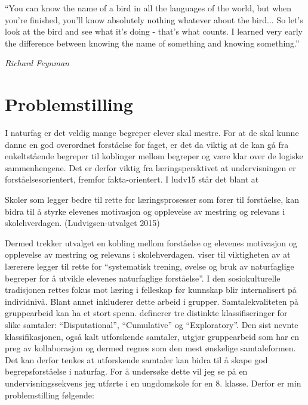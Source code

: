 \documentclass[main.tex]{subfiles}
\begin{document}
\setlength{\epigraphwidth}{0.8\textwidth}
\epigraph{``You can know the name of a bird in all the languages of the world, 
but when you're finished, you'll know absolutely nothing whatever about the bird...
So let's look at the bird and see what it’s doing - that's what counts. I learned 
very early the difference between knowing the name of something and knowing something.''}
{\textit{Richard Feynman}}

\section*{Problemstilling}

I naturfag er det veldig mange begreper elever skal mestre. For at de skal kunne danne en god 
overordnet forståelse for faget, er det da viktig at de kan gå fra enkeltstående begreper til 
koblinger mellom begreper og være klar over de logiske sammenhengene. Det er derfor viktig fra 
læringspersktivet at undervisningen er forståelsesorientert, fremfor fakta-orientert. I \citeA
{ludv15} står det blant at
\begin{displayquote}
Skoler som legger bedre til rette for læringsprosesser som fører til forståelse, kan bidra til å 
styrke elevenes motivasjon og opplevelse av mestring og relevans i skolehverdagen. 
(Ludvigsen-utvalget 2015)
\end{displayquote}
Dermed trekker utvalget en kobling mellom forståelse og elevenes motivasjon og opplevelse av
mestring og relevans i skolehverdagen.  viser til viktigheten av at 
lærerere legger til rette for ``systematisk trening, øvelse og bruk av naturfaglige begreper 
for å utvikle elevenes naturfaglige forståelse''. I den sosiokulturelle tradisjonen rettes 
fokus mot læring i felleskap før kunnskap blir internalisert på individnivå. Blant annet 
inkluderer dette arbeid i grupper. Samtalekvaliteten på gruppearbeid kan ha et stort spenn. 
 definerer tre distinkte klassifiseringer for slike samtaler:
``Disputational'', ``Cumulative'' og ``Exploratory''. Den sist nevnte klassifikasjonen,
også kalt utforskende samtaler, utgjør gruppearbeid som har en preg av kollaborasjon og dermed
regnes som den mest ønskelige samtaleformen. Det kan derfor tenkes at utforskende samtaler 
kan bidra til å skape god begrepsforståelse i naturfag. For å undersøke dette vil jeg se 
på en undervisningssekvens jeg utførte i en ungdomskole for en 8. klasse.
\newline
\newline
Derfor er min problemstilling følgende:
\end{document}
